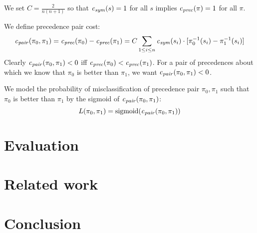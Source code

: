 \documentclass{article}
\begin{document}
We set $C = \frac{2}{n(n+1)}$ so that $\CostSym(s) = 1$ for all $s$ implies $\CostPrec(\pi) = 1$ for all $\pi$.

We define precedence pair cost:
$$
\CostPrecPair(\pi_0, \pi_1) =
\CostPrec(\pi_0) - \CostPrec(\pi_1) =
C \sum_{1 \leq i \leq n} \CostSym(s_i) \cdot [\inv{\pi_0}(s_i) - \inv{\pi_1}(s_i)]
$$
Clearly $\CostPrecPair(\pi_0, \pi_1) < 0$ iff $\CostPrec(\pi_0) < \CostPrec(\pi_1)$.
For a pair of precedences about which we know that $\pi_0$ is better than $\pi_1$,
we want $\CostPrecPair(\pi_0, \pi_1) < 0$.

We model the probability of misclassification of precedence pair $\pi_0, \pi_1$
such that $\pi_0$ is better than $\pi_1$
by the sigmoid of $\CostPrecPair(\pi_0, \pi_1)$:
$$
L(\pi_0, \pi_1) = \sigmoid(\CostPrecPair(\pi_0, \pi_1))
$$

\section{Evaluation}
\label{sec:evaluation}

\section{Related work}

\section{Conclusion}


\end{document}
